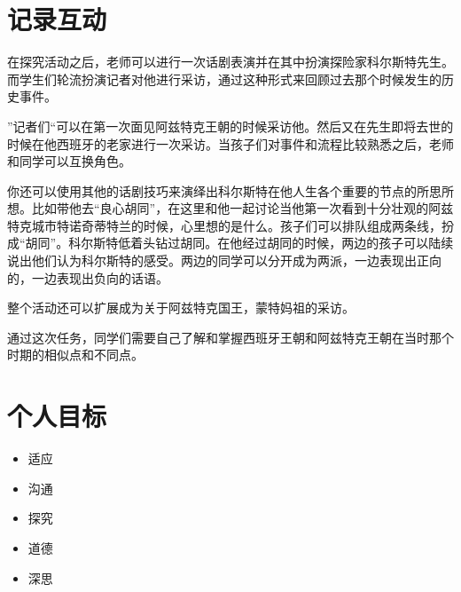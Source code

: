 \section{记录互动}
     在探究活动之后，老师可以进行一次话剧表演并在其中扮演探险家科尔斯特先生。而学生们轮流扮演记者对他进行采访，通过这种形式来回顾过去那个时候发生的历史事件。\par
     ”记者们“可以在第一次面见阿兹特克王朝的时候采访他。然后又在先生即将去世的时候在他西班牙的老家进行一次采访。当孩子们对事件和流程比较熟悉之后，老师和同学可以互换角色。\par
     你还可以使用其他的话剧技巧来演绎出科尔斯特在他人生各个重要的节点的所思所想。比如带他去“良心胡同”，在这里和他一起讨论当他第一次看到十分壮观的阿兹特克城市特诺奇蒂特兰的时候，心里想的是什么。孩子们可以排队组成两条线，扮成“胡同”。科尔斯特低着头钻过胡同。在他经过胡同的时候，两边的孩子可以陆续说出他们认为科尔斯特的感受。两边的同学可以分开成为两派，一边表现出正向的，一边表现出负向的话语。\par
     整个活动还可以扩展成为关于阿兹特克国王，蒙特妈祖的采访。\par
     通过这次任务，同学们需要自己了解和掌握西班牙王朝和阿兹特克王朝在当时那个时期的相似点和不同点。

\section{个人目标}
   \begin{itemize}
     \item 适应
     \item 沟通
     \item 探究
     \item 道德
     \item 深思 
   \end{itemize}  
